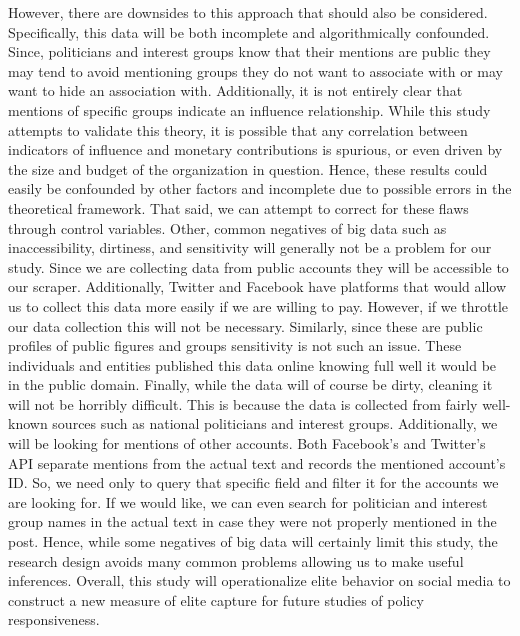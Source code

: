 \documentclass[dvips,12pt]{article}
\begin{document}
 However, there are downsides to this approach that should also be considered. Specifically, this data will be both incomplete and algorithmically confounded. Since, politicians and interest groups know that their mentions are public they may tend to avoid mentioning groups they do not want to associate with or may want to hide an association with. Additionally, it is not entirely clear that mentions of specific groups indicate an influence relationship. While this study attempts to validate this theory, it is possible that any correlation between indicators of influence and monetary contributions is spurious, or even driven by the size and budget of the organization in question. Hence, these results could easily be confounded by other factors and incomplete due to possible errors in the theoretical framework. That said, we can attempt to correct for these flaws through control variables. Other, common negatives of big data such as inaccessibility, dirtiness, and sensitivity will generally not be a problem for our study. Since we are collecting data from public accounts they will be accessible to our scraper. Additionally, Twitter and Facebook have platforms that would allow us to collect this data more easily if we are willing to pay. However, if we throttle our data collection this will not be necessary. Similarly, since these are public profiles of public figures and groups sensitivity is not such an issue. These individuals and entities published this data online knowing full well it would be in the public domain. Finally, while the data will of course be dirty, cleaning it will not be horribly difficult. This is because the data is collected from fairly well-known sources such as national politicians and interest groups. Additionally, we will be looking for mentions of other accounts. Both Facebook's and Twitter's API separate mentions from the actual text and records the mentioned account’s ID.  So, we need only to query that specific field and filter it for the accounts we are looking for. If we would like, we can even search for politician and interest group names in the actual text in case they were not properly mentioned in the post. Hence, while some negatives of big data will certainly limit this study, the research design avoids many common problems allowing us to make useful inferences. Overall, this study will operationalize elite behavior on social media to construct a new measure of elite capture for future studies of policy responsiveness.  

\newpage



\end{document}
